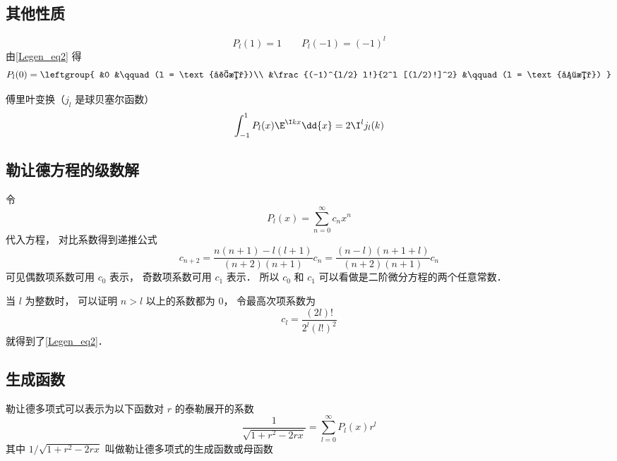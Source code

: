 \subsection{其他性质}
\begin{equation}
P_l(1) = 1 \qquad P_l(-1) = (-1)^l
\end{equation}
由\autoref{Legen_eq2} 得
\begin{equation}\label{Legen_eq5}
P_l(0) = \leftgroup{
&0 &\qquad (l = \text{奇数})\\
&\frac{(-1)^{l/2} l!}{2^l [(l/2)!]^2} &\qquad (l = \text{偶数})
}\end{equation}

傅里叶变换（$j_l$ 是球贝塞尔函数）
\begin{equation}\label{Legen_eq3}
\int_{-1}^1 P_l(x) \E^{\I k x} \dd{x} = 2 \I^l j_l(k)
\end{equation}

\subsection{勒让德方程的级数解}
令
\begin{equation}
P_l(x) = \sum_{n = 0}^\infty c_n x^n
\end{equation}
代入方程， 对比系数得到递推公式
\begin{equation}
c_{n+2} = \frac{n(n+1)-l(l+1)}{(n+2)(n+1)}c_n = \frac{(n-l)(n+1+l)}{(n+2)(n+1)}c_n
\end{equation}
可见偶数项系数可用 $c_0$ 表示， 奇数项系数可用 $c_1$ 表示． 所以 $c_0$ 和 $c_1$ 可以看做是二阶微分方程的两个任意常数．

当 $l$ 为整数时， 可以证明 $n > l$ 以上的系数都为 0， 令最高次项系数为
\begin{equation}
c_l = \frac{(2l)!}{2^l (l!)^2}
\end{equation}
就得到了\autoref{Legen_eq2}．

\subsection{生成函数}
勒让德多项式可以表示为以下函数对 $r$ 的泰勒展开的系数
\begin{equation}
\frac{1}{\sqrt{1 + r^2 - 2rx}} = \sum_{l = 0}^\infty P_l(x) r^l
\end{equation}
其中 $1/\sqrt {1+ r^2 - 2rx}$ 叫做勒让德多项式的生成函数或母函数